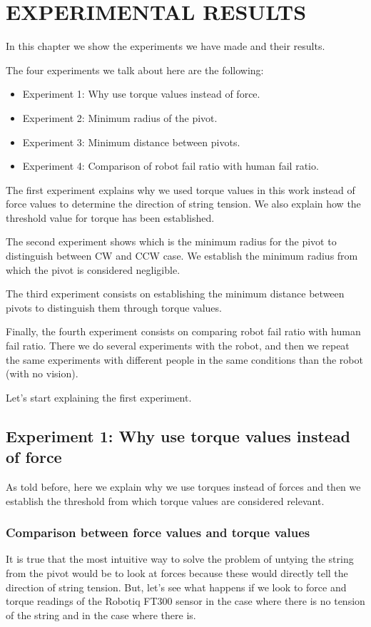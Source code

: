 \chapter{EXPERIMENTAL RESULTS}
\label{ch:Experimental Results}
In this chapter we show the experiments we have made and their results.

The four experiments we talk about here are the following:
\begin{itemize}
 \item Experiment 1: Why use torque values instead of force.
 \item Experiment 2: Minimum radius of the pivot.
 \item Experiment 3: Minimum distance between pivots.
 \item Experiment 4: Comparison of robot fail ratio with human fail ratio.
\end{itemize}

The first experiment explains why we used torque values in this work instead of force values to determine the direction of string tension. We also explain how the threshold value for torque has been established.

The second experiment shows which is the minimum radius for the pivot to distinguish between CW and CCW case. We establish the minimum radius from which the pivot is considered negligible.

The third experiment consists on establishing the minimum distance between pivots to distinguish them through torque values.

Finally, the fourth experiment consists on comparing robot fail ratio with human fail ratio. There we do several experiments with the robot, and then we repeat the same experiments with different people in the same conditions than the robot (with no vision).

Let's start explaining the first experiment.

\section{Experiment 1: Why use torque values instead of force}
As told before, here we explain why we use torques instead of forces and then we establish the threshold from which torque values are considered relevant.

\subsection{Comparison between force values and torque values}
It is true that the most intuitive way to solve the problem of untying the string from the pivot would be to look at forces because these would directly tell the direction of string tension. But, let's see what happens if we look to force and torque readings of the Robotiq FT300 sensor in the case where there is no tension of the string and in the case where there is.

